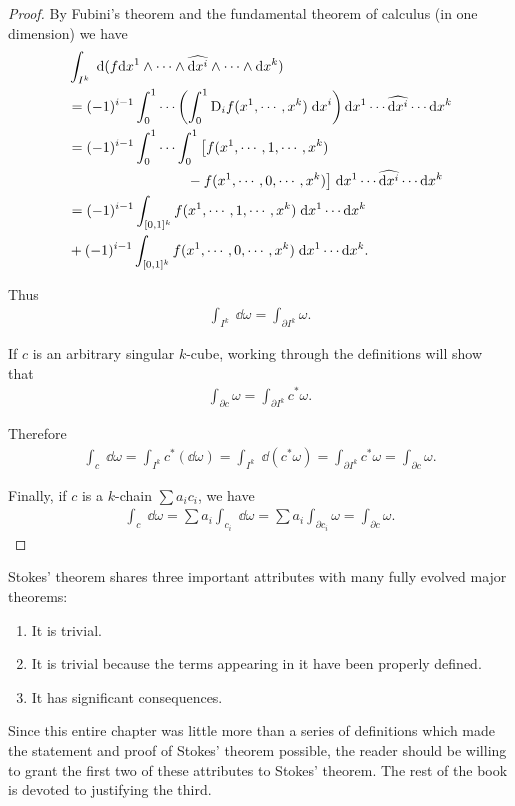 \begin{proof}
    By Fubini's theorem and the fundamental theorem of calculus (in one dimension) we have
    \begin{align*}
        & \int_{I^{k}}\;\mathrm{d}(f \mathrm{d} x^1\wedge\cdots\wedge\widehat{\mathrm{d} x^i}\wedge\cdots\wedge \mathrm{d} x^k) \\
        & = (-1)^{i-1}\int_{0}^{1}\cdots\left(\int_{0}^{1}\mathrm{D}_{i}f(x^{1},\cdots,x^{k})\;\mathrm{d} x^{i}\right)\mathrm{d} x^{1}\cdots\widehat{\mathrm{d} x^i}\cdots\mathrm{d} x^k\\
        & = (-1)^{i-1}\int_{0}^{1}\cdots\int_{0}^{1}\big[f(x^{1},\cdots,1,\cdots,x^{k}) \\
        & \hspace*{8.5em} - f(x^{1},\cdots,0,\cdots,x^{k})\big]\;\mathrm{d} x^{1}\cdots\widehat{\mathrm{d} x^i}\cdots\mathrm{d} x^k\\
        & = (-1)^{i-1}\int_{[0,1]^k} f(x^1,\cdots,1,\cdots,x^k)\;\mathrm{d} x^1\cdots\mathrm{d} x^k \\
        & + (-1)^{i-1}\int_{[0,1]^k} f(x^1,\cdots,0,\cdots,x^k)\;\mathrm{d} x^1\cdots\mathrm{d} x^k.
    \end{align*}

    Thus 
    \begin{align*}
        \int_{I^k}\;\dd\omega=\int_{\partial I^k}\omega.
    \end{align*}

    If $c$ is an arbitrary singular $k$-cube, working through the definitions will show that
    \begin{align*}
        \int_{\partial c}\omega=\int_{\partial I^k}c^*\omega.
    \end{align*}

    Therefore 
    \begin{align*}
        \int_{c}\;\dd\omega
        = \int_{I^{k}}c^{*}(\dd\omega)
        = \int_{I^{k}}\;\dd(c^{*}\omega)
        = \int_{\partial I^{k}}c^{*}\omega
        = \int_{\partial c}\omega.
    \end{align*}

    Finally, if $c$ is a $k$-chain $\sum a_ic_i$, we have 
    \begin{align*}
        \int_c\;\dd\omega
        = \sum a_i\int_{c_i}\;\dd\omega
        = \sum a_i\int_{\partial c_i}\omega
        = \int_{\partial c}\omega.
    \end{align*}
\end{proof}

Stokes' theorem shares three important attributes with
many fully evolved major theorems:
\begin{enumerate}[label=\arabic*.]
    \item It is trivial. 
    \item It is trivial because the terms appearing in it have been properly defined.
    \item It has significant consequences.
\end{enumerate}
Since this entire chapter was little more than a series of definitions which made the 
statement and proof of Stokes' theorem possible, the reader should be willing to grant the
first two of these attributes to Stokes' theorem. The rest of the book is devoted to 
justifying the third.

